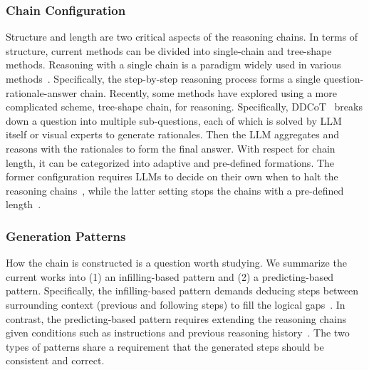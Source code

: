 \subsubsection{Chain Configuration}
\label{sec:mcot_config}
Structure and length are two critical aspects of the reasoning chains.
In terms of structure, current methods can be divided into single-chain and tree-shape methods.
Reasoning with a single chain is a paradigm widely used in various methods~\cite{scienceqa, multimodal-cot}. Specifically, the step-by-step reasoning process forms a single question-rationale-answer chain. 
Recently, some methods have explored using a more complicated scheme, \ie tree-shape chain, for reasoning. Specifically, DDCoT~\cite{zheng2023ddcot} breaks down a question into multiple sub-questions, each of which is solved by LLM itself or visual experts to generate rationales. Then the LLM aggregates and reasons with the rationales to form the final answer.
With respect for chain length, it can be categorized into adaptive and pre-defined formations. 
The former configuration requires LLMs to decide on their own when to halt the reasoning chains~\cite{chameleon, scienceqa, mm-react, multimodal-cot, visual-chatgpt, visprog}, while the latter setting stops the chains with a pre-defined length~\cite{cot-prompt-tuning, CAT, vip, vcot}.

\vspace{-0.5em}
\subsubsection{Generation Patterns}
\label{sec:mcot_patt}
How the chain is constructed is a question worth studying. 
We summarize the current works into (1) an infilling-based pattern and (2) a predicting-based pattern. Specifically, the infilling-based pattern demands deducing steps between surrounding context (previous and following steps) to fill the logical gaps~\cite{vip, vcot}. 
In contrast, the predicting-based pattern requires extending the reasoning chains given conditions such as instructions and previous reasoning history~\cite{chameleon, scienceqa, mm-react, multimodal-cot, visual-chatgpt, visprog}. 
The two types of patterns share a requirement that the generated steps should be consistent and correct.


